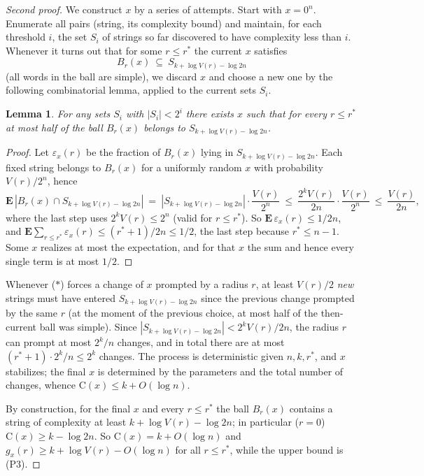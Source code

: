 \documentclass[11pt,a4paper]{article}
\newtheorem{lemma}[theorem]{Lemma}
\theoremstyle{definition}
\newcommand{\C}{\mathrm{C}}
\newcommand{\eps}{\varepsilon}
\renewcommand{\le}{\leqslant}
\renewcommand{\ge}{\geqslant}
\begin{document}
\begin{proof}[Second proof]
We construct $x$ by a series of attempts. Start with $x=0^n$. Enumerate all
pairs (string, its complexity bound) and maintain, for each threshold $i$, the
set $S_i$ of strings so far discovered to have complexity less than $i$.
Whenever it turns out that for some $r\le r^*$ the current $x$ satisfies
\[
  B_r(x)\ \subseteq\ S_{k+\log V(r)-\log2n}
  \tag{$*$}
\]
(all words in the ball are simple), we discard $x$ and choose a new one by the
following combinatorial lemma, applied to the current sets $S_i$.

\begin{lemma}\label{lem:half}
For any sets $S_i$ with $|S_i|<2^i$ there exists $x$ such that for every $r\le
r^*$ at most half of the ball $B_r(x)$ belongs to $S_{k+\log V(r)-\log2n}$.
\end{lemma}

\begin{proof}
Let $\eps_x(r)$ be the fraction of $B_r(x)$ lying in $S_{k+\log V(r)-\log2n}$.
Each fixed string belongs to $B_r(x)$ for a uniformly random $x$ with
probability $V(r)/2^n$, hence
\[
  \mathbf{E}\,|B_r(x)\cap S_{k+\log V(r)-\log2n}|
  \ =\ |S_{k+\log V(r)-\log2n}|\cdot\frac{V(r)}{2^n}
  \ \le\ \frac{2^kV(r)}{2n}\cdot\frac{V(r)}{2^n}
  \ \le\ \frac{V(r)}{2n},
\]
where the last step uses $2^kV(r)\le2^n$ (valid for $r\le r^*$). So
$\mathbf{E}\,\eps_x(r)\le1/2n$, and
$\mathbf{E}\sum_{r\le r^*}\eps_x(r)\le(r^*+1)/2n\le1/2$, the last step
because $r^*\le n-1$. Some $x$ realizes at most
the expectation, and for that $x$ the sum and hence every single term is at most $1/2$.
\end{proof}

Whenever ($*$) forces a change of $x$ prompted by a radius $r$, at least
$V(r)/2$ \emph{new} strings must have entered $S_{k+\log V(r)-\log2n}$ since
the previous change prompted by the same $r$ (at the moment of the previous
choice, at most half of the then-current ball was simple). Since
$|S_{k+\log V(r)-\log2n}|<2^kV(r)/2n$, the radius $r$ can prompt at most
$2^k/n$ changes, and in total there are at most $(r^*+1)\cdot2^k/n\le2^k$
changes.
The process is deterministic given $n,k,r^*$, and $x$ stabilizes; the final $x$
is determined by the parameters and the total number of changes, whence
$\C(x)\le k+O(\log n)$.

By construction, for the final $x$ and every $r\le r^*$ the ball $B_r(x)$
contains a string of complexity at least $k+\log V(r)-\log2n$; in particular
($r=0$) $\C(x)\ge k-\log2n$. So $\C(x)=k+O(\log n)$ and
$g_x(r)\ge k+\log V(r)-O(\log n)$ for all $r\le r^*$, while the upper bound is
(P3).
\end{proof}
\end{document}
